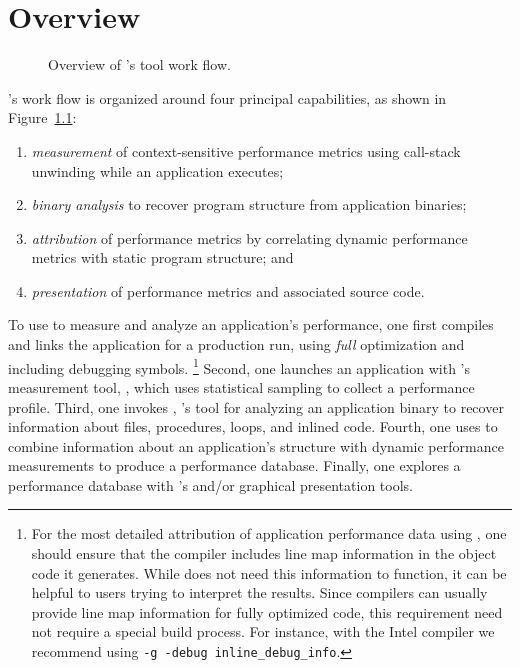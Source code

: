 \documentclass[11pt,letterpaper]{report}
\begin{document}
\chapter{\HPCToolkit{} Overview}


\begin{figure}[t]
\caption{Overview of \HPCToolkit{}'s tool work flow.}

\label{fig:hpctoolkit-overview:a}
\end{figure}

\HPCToolkit{}'s work flow is organized around four principal capabilities, as shown in Figure~\ref{fig:hpctoolkit-overview:a}:
\begin{enumerate}
  \item \emph{measurement} of context-sensitive performance metrics using call-stack unwinding
while an application executes;
  \item \emph{binary analysis} to recover program structure from application binaries;
  \item \emph{attribution} of performance metrics by correlating dynamic performance metrics with static program structure; and
  \item \emph{presentation} of performance metrics and associated source code.
\end{enumerate}

To use \HPCToolkit{} to measure and analyze an application's performance, one first compiles and links the application for a production run, using \emph{full} optimization and including debugging symbols.%
\footnote{%
For the most detailed attribution of application performance data using \HPCToolkit{}, one should ensure that the compiler includes line map information in the object code it generates. While \HPCToolkit{} does not need this information to function, it can be helpful to users trying to interpret the results. Since compilers can usually provide line map information for fully optimized code, this requirement need not require a special build process. For instance, with the Intel compiler we recommend using \texttt{-g -debug inline\_debug\_info}.}
Second, one launches an application with \HPCToolkit{}'s measurement tool, \hpcrun{}, which uses statistical sampling to collect a performance profile.
Third, one invokes \hpcstruct{}, \HPCToolkit{}'s tool for analyzing an application binary to recover information about files, procedures, loops, and inlined code.
Fourth, one uses \hpcprof{} to combine information about an application's structure with dynamic performance measurements to produce a performance database.
Finally, one explores a performance database with \HPCToolkit{}'s \hpcviewer{} and/or \hpctraceviewer{} graphical presentation tools.
\end{document}
